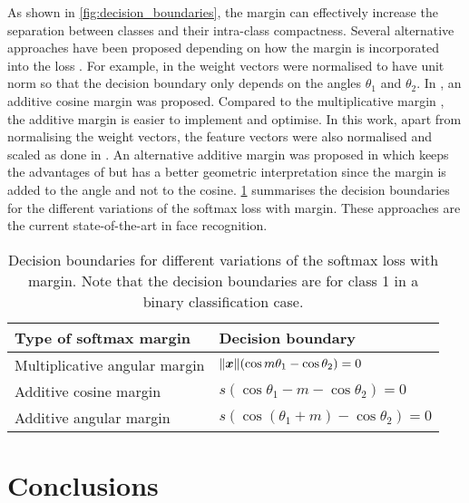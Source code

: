 \documentclass[conference]{IEEEtran}
\DeclarePairedDelimiter\norm{\lVert}{\rVert}
\begin{document}
As shown in \cref{fig:decision_boundaries}, the margin can effectively increase the separation between classes and their intra-class compactness. Several alternative approaches have been proposed depending on how the margin is incorporated into the loss \cite{liu2017sphereface,wang2018cosface,wang2018additive,deng2018arcface}. For example, in \cite{liu2017sphereface} the weight vectors were normalised to have unit norm so that the decision boundary only depends on the angles $\theta_1$ and $\theta_2$. In \cite{wang2018cosface,wang2018additive}, an additive cosine margin was proposed. Compared to the multiplicative margin \cite{liu2016large,liu2017sphereface}, the additive margin is easier to implement and optimise. In this work, apart from normalising the weight vectors, the feature vectors were also normalised and scaled as done in \cite{ranjan2017l2}. An alternative additive margin was proposed in \cite{deng2018arcface} which keeps the advantages of \cite{wang2018cosface,wang2018additive} but has a better geometric interpretation since the margin is added to the angle and not to the cosine. \cref{tab:decision_boundaries} summarises the decision boundaries for the different variations of the softmax loss with margin. These approaches are the current state-of-the-art in face recognition.

\begin{table}[tb]
    \centering
    \caption{Decision boundaries for different variations of the softmax loss with margin. Note that the decision boundaries are for class 1 in a binary classification case.}
    \label{tab:decision_boundaries}
    \begin{tabular}{@{}ll@{}}
    \toprule
    Type of softmax margin                                         & Decision boundary                              \\ \midrule
    Multiplicative angular margin \cite{liu2017sphereface}         & $\norm{\bm{x}}(\cos m\theta_1-\cos\theta_2)=0$ \\
    Additive cosine margin \cite{wang2018cosface,wang2018additive} & $s(\cos\theta_1-m-\cos\theta_2)=0$             \\
    Additive angular margin \cite{deng2018arcface}                 & $s(\cos(\theta_1+m)-\cos\theta_2)=0$           \\ \bottomrule
    \end{tabular}
\end{table}

\section{Conclusions}
\label{conclusions}
\end{document}
